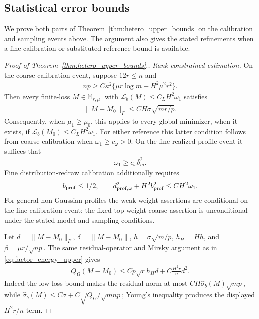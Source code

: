 \documentclass[numsec,webpdf,modern,large,namedate]{oup-authoring-template}
\theoremstyle{plain}
\theoremstyle{remark}
\newif\ifmarkchanges
\newenvironment{revision}{\begingroup\ifmarkchanges\color{red}\fi}{\endgroup}
\begin{document}
\begin{revision}
\subsection{Statistical error bounds}
We prove both parts of Theorem~\ref{thm:hetero_upper_bounds} on
the calibration and sampling events above. The argument also gives the
stated refinements when a fine-calibration or substituted-reference bound
is available.

\begin{proof}[Proof of Theorem~\ref{thm:hetero_upper_bounds}.]
\textit{Rank-constrained estimation.} On the coarse calibration event, suppose $12r\le n$ and
\begin{align}
 np\ge C\kappa^2\{\bar\mu r\log m+H^2\bar\mu^2r^2\}.
 \label{eq:vp_structural_sampling}
\end{align}
Then every finite-loss $M\in\mathbb M_{r,\mu_1}$ with
$\mathcal L_b(M)\le C_LH^2\omega_1$ satisfies
\begin{align}
 \|M-M_0\|_F\le CH\sigma\sqrt{mr/p}.
 \label{eq:vp_factor_rate}
\end{align}
Consequently, when $\mu_1\ge\mu_0$, this applies to every global minimizer, when it exists, if
$\mathcal L_b(M_0)\le C_LH^2\omega_1$.
For either reference this latter condition follows from coarse calibration
when $\omega_1\ge c_\omega>0$.
On the fine realized-profile event it suffices that
\begin{align}
 \omega_1\ge c_\omega\delta_m^2.
 \label{eq:vp_factor_weight_realized}
\end{align}
Fine distribution-redraw calibration additionally requires
\begin{align}
 b_{\rm prof}\le1/2,\qquad
 d_{\rm prof,\omega}^2+H^2b_{\rm prof}^2
       \le CH^2\omega_1.
 \label{eq:vp_factor_redraw_condition}
\end{align}
For general non-Gaussian profiles the weak-weight assertions are conditional
on the fine-calibration event; the fixed-top-weight coarse assertion is
unconditional under the stated model and sampling conditions.

Let $d=\|M-M_0\|_F$, $\delta=\|M-M_0\|$, $h=\sigma\sqrt{m/p}$,
$h_H=Hh$, and $\beta=\bar\mu r/\sqrt{np}$.
The same residual-operator and Mirsky argument as in
\eqref{eq:factor_energy_upper} gives
\begin{align}
 Q_\Omega(M-M_0)\le Cp\sqrt r h_Hd+C\frac{H^2r}{n}d^2.
 \label{eq:variance_profile_sampled_upper}
\end{align}
Indeed the low-loss bound makes the residual norm at most
$CH\widehat\sigma_b(M)\sqrt{mp}$, while
$\widehat\sigma_b(M)\le C\sigma+C\sqrt{Q_\Omega}/\sqrt{mnp}$;
Young's inequality produces the displayed $H^2r/n$ term.


\end{proof}
\end{revision}
\end{document}

